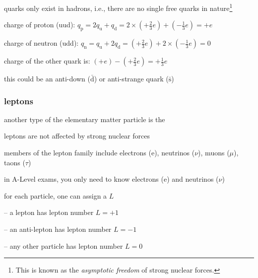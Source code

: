 \cmt quarks only exist in hadrons, i.e., there are no single free quarks in nature\footnote{This is known as the \emph{asymptotic freedom} of strong nuclear forces.}



\sol charge of proton (uud): $q_\text{p} = 2q_\text{u} + q_\text{d} = 2\times\left(+\frac{2}{3}e\right) + \left(-\frac{1}{3}e\right) = +e$

\eqyskip charge of neutron (udd): $q_\text{n} = q_\text{u} + 2q_\text{d} = \left(+\frac{2}{3}e\right) + 2\times\left(-\frac{1}{3}e\right) = 0$ \eoe


\sol charge of the other quark is: $(+e) - \left(+\frac{2}{3}e\right) = +\frac{1}{3}e$

this could be an anti-down ($\bar{\text{d}}$) or anti-strange quark ($\bar{\text{s}}$) \eoe



\subsubsection{leptons}

another type of the elementary matter particle is the 

\cmt leptons are not affected by strong nuclear forces

\cmt members of the lepton family include electrons (e), neutrinos ($\nu$), muons ($\mu$), taons ($\tau$)

in A-Level exams, you only need to know electrons (e) and neutrinos ($\nu$)


\cmt for each particle, one can assign a  $L$

\begin{compactitem}
	\item[--] a lepton has lepton number $L=+1$
	
	\item[--] an anti-lepton has lepton number $L=-1$
	
	 \item[--]any other particle has lepton number $L=0$
\end{compactitem}


\vspace*{\baselineskip}

